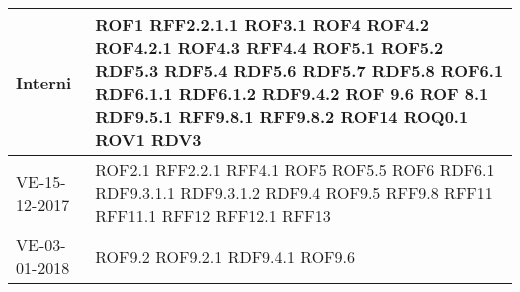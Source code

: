 \documentclass[../AnalisideiRequisiti.tex]{subfiles}
\begin{document}
\begin{longtable}{| p{4cm} | p{4cm} |}
		\newline Interni &  \newline ROF1 \newline RFF2.2.1.1 \newline ROF3.1 \newline ROF4 \newline ROF4.2  \newline ROF4.2.1  \newline ROF4.3  \newline RFF4.4 \newline ROF5.1 \newline ROF5.2 \newline RDF5.3 \newline RDF5.4 \newline RDF5.6  \newline RDF5.7  \newline RDF5.8 \newline ROF6.1 \newline RDF6.1.1 \newline RDF6.1.2 \newline RDF9.4.2 \newline ROF 9.6  \newline ROF 8.1  \newline RDF9.5.1  \newline RFF9.8.1  \newline RFF9.8.2 \newline ROF14 \newline ROQ0.1  \newline ROV1  \newline RDV3 \\[1em]
	\hline
		\newline  VE-15-12-2017 & \newline ROF2.1 \newline RFF2.2.1 \newline RFF4.1 \newline ROF5 \newline ROF5.5 \newline ROF6 \newline RDF6.1 \newline RDF9.3.1.1 \newline RDF9.3.1.2 \newline RDF9.4 \newline ROF9.5 \newline RFF9.8 \newline RFF11 \newline RFF11.1 \newline RFF12 \newline RFF12.1 \newline RFF13 \\[1em]
	\hline
		\newline VE-03-01-2018 &  \newline ROF9.2 \newline ROF9.2.1 \newline RDF9.4.1 \newline ROF9.6 \\[1em]


\end{longtable}
\end{document}
